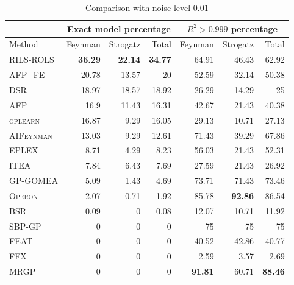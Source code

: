 \documentclass[a4paper,12pt]{elsarticle}
\begin{document}
\begin{table}[!htb]
	\caption{Comparison with noise level 0.01}\label{tab:comp_noise001}
	\centering
	\begin{tabular}{l|rrr|rrr} \hline
		& \multicolumn{3}{c|}{Exact model percentage} & \multicolumn{3}{c}{$R^2 > 0.999$ percentage}\\ \hline
		Method & Feynman & Strogatz & Total & Feynman & Strogatz & Total \\ \hline
		\textsc{RILS-ROLS}&\bf{36.29}&\bf{22.14}&\bf{34.77}&64.91&46.43&62.92\\
		\textsc{AFP\_FE}&20.78&13.57&20&52.59&32.14&50.38\\
		\textsc{DSR}&18.97&18.57&18.92&26.29&14.29&25\\
		\textsc{AFP}&16.9&11.43&16.31&42.67&21.43&40.38\\
		\textsc{gplearn}&16.87&9.29&16.05&29.13&10.71&27.13\\
		\textsc{AIFeynman}&13.03&9.29&12.61&71.43&39.29&67.86\\
		\textsc{EPLEX}&8.71&4.29&8.23&56.03&21.43&52.31\\
		\textsc{ITEA}&7.84&6.43&7.69&27.59&21.43&26.92\\
		\textsc{GP-GOMEA}&5.09&1.43&4.69&73.71&71.43&73.46\\
		\textsc{Operon}&2.07&0.71&1.92&85.78&\bf{92.86}&86.54\\
		\textsc{BSR}&0.09&0&0.08&12.07&10.71&11.92\\
		\textsc{SBP-GP}&0&0&0&75&75&75\\
		\textsc{FEAT}&0&0&0&40.52&42.86&40.77\\
		\textsc{FFX}&0&0&0&2.59&3.57&2.69\\
		\textsc{MRGP}&0&0&0&\bf{91.81}&60.71&\bf{88.46}\\
		\hline
	\end{tabular}
\end{table}

\end{document}
